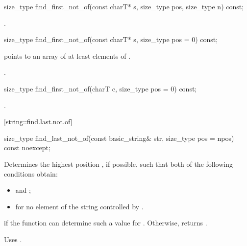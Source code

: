 %
%
\begin{itemdecl}
size_type
  find_first_not_of(const charT* s, size_type pos, size_type n) const;
\end{itemdecl}

\begin{itemdescr}
\pnum
\returns
{}.
\end{itemdescr}

%
%
\begin{itemdecl}
size_type find_first_not_of(const charT* s, size_type pos = 0) const;
\end{itemdecl}

\begin{itemdescr}
\pnum
\requires {} points to an array of at least 
elements of .

\pnum
\returns
{}.
\end{itemdescr}

%
%
\begin{itemdecl}
size_type find_first_not_of(charT c, size_type pos = 0) const;
\end{itemdecl}

\begin{itemdescr}
\pnum
\returns
{}.
\end{itemdescr}

[string::find.last.not.of]{}

%
%
\begin{itemdecl}
size_type
  find_last_not_of(const basic_string& str,
                   size_type pos = npos) const noexcept;
\end{itemdecl}

\begin{itemdescr}
\pnum
\effects
Determines the highest position , if possible, such that both of
the following conditions obtain:

\begin{itemize}
\item
{}
and
;
\item
{}%
for no element  of the string
controlled by .
\end{itemize}

\pnum
\returns
{} if the function can determine such a value for .
Otherwise, returns
.

\pnum
\notes
Uses
.
\end{itemdescr}

